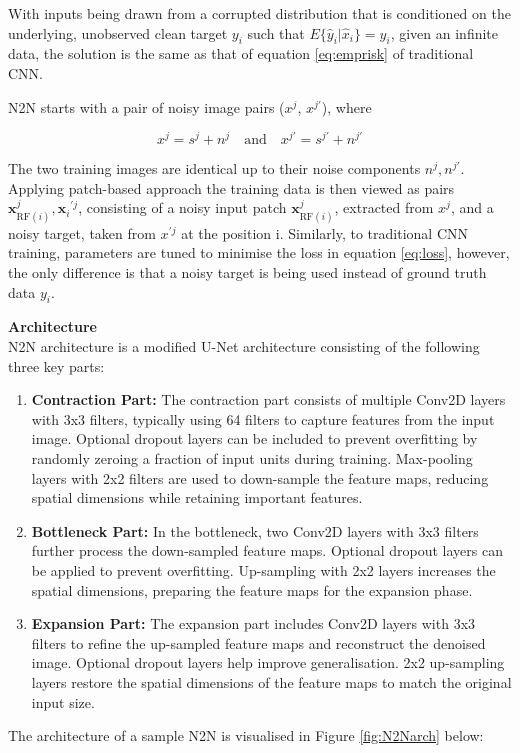 With inputs being drawn from a corrupted distribution that is conditioned on the underlying, unobserved clean target $y_i$ such that  $E\{\hat{y}_i|\hat{x}_i\} = y_i$, given an infinite data, the solution is the same as that of equation \ref{eq:emprisk} of traditional \gls{CNN}.

\gls{N2N}  starts with  a pair of  noisy image pairs  ($x^j$, $x^{j'}$), where

\begin{equation}
	x^j = s^j + n^j \quad \text{and} \quad x^{j'} = s^{j'} + n^{j'}
	\label{eq:noisemodel}
\end{equation}

The two training images are identical up to their noise components $n^j, n^{j'}$. Applying patch-based approach the training data is then viewed as pairs ${\mathbf{x}}_{{\text{RF}}(i)}^j, {{\mathbf{x}}_i}^{'j}$, consisting of a noisy input patch ${\mathbf{x}}_{{\text{RF}}(i)}^j$, extracted from $x^j$, and a noisy target, taken from $x^{'j}$ at the position i. Similarly, to traditional \gls{CNN} training, parameters are tuned to minimise the loss in equation \ref{eq:loss}, however, the only difference is that a noisy target is being used instead of ground truth data $y_i$. 

\textbf{Architecture} \\
\gls{N2N} architecture is a modified \gls{U-Net} architecture consisting of the following three key parts:
\begin{enumerate}
	\item \textbf{Contraction Part:} The contraction part consists of multiple Conv2D layers with 3x3 filters, typically using 64 filters to capture features from the input image. Optional dropout layers can be included to prevent overfitting by randomly zeroing a fraction of input units during training. Max-pooling layers with 2x2 filters are used to down-sample the feature maps, reducing spatial dimensions while retaining important features.
	\item \textbf{Bottleneck Part:} In the bottleneck, two Conv2D layers with 3x3 filters further process the down-sampled feature maps. Optional dropout layers can be applied to prevent overfitting. Up-sampling with 2x2 layers increases the spatial dimensions, preparing the feature maps for the expansion phase.
	\item \textbf{Expansion Part:} The expansion part includes Conv2D layers with 3x3 filters to refine the up-sampled feature maps and reconstruct the denoised image. Optional dropout layers help improve generalisation. 2x2 up-sampling layers restore the spatial dimensions of the feature maps to match the original input size.
\end{enumerate}
The architecture of a sample \gls{N2N} is visualised in Figure \ref{fig:N2Narch} below:

